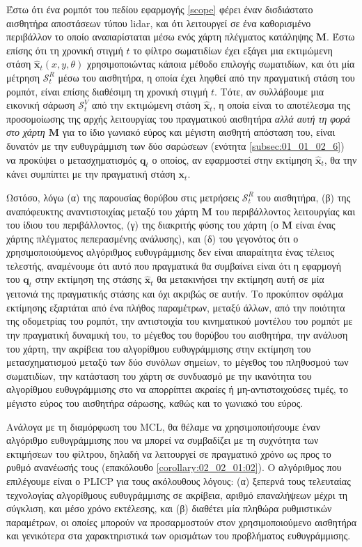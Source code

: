 Έστω ότι ένα ρομπότ του πεδίου εφαρμογής \ref{scope} φέρει έναν δισδιάστατο
αισθητήρα αποστάσεων τύπου lidar, και ότι λειτουργεί σε ένα καθορισμένο
περιβάλλον το οποίο αναπαρίσταται μέσω ενός χάρτη πλέγματος κατάληψης $\bm{M}$.
Έστω επίσης ότι τη χρονική στιγμή $t$ το φίλτρο σωματιδίων έχει εξάγει μια
εκτιμώμενη στάση $\hat{\bm{x}}_t(x,y,\theta)$ χρησιμοποιώντας κάποια μέθοδο
επιλογής σωματιδίων, και ότι μία μέτρηση $\mathcal{S}^R_t$ μέσω του αισθητήρα,
η οποία έχει ληφθεί από την πραγματική στάση του ρομπότ, είναι επίσης διαθέσιμη
τη χρονική στιγμή $t$. Τότε, αν συλλάβουμε μια εικονική σάρωση
$\mathcal{S}^V_t$ από την εκτιμώμενη στάση $\hat{\bm{x}}_t$, η οποία είναι το
αποτέλεσμα της προσομοίωσης της αρχής λειτουργίας του πραγματικού αισθητήρα
\textit{αλλά αυτή τη φορά στο χάρτη $\bm{M}$} για το ίδιο γωνιακό εύρος και
μέγιστη αισθητή απόσταση του, είναι δυνατόν με την ευθυγράμμιση των δύο
σαρώσεων (ενότητα \ref{subsec:01_01_02_6}) να προκύψει ο μετασχηματισμός
$\bm{q}_t$ ο οποίος, αν εφαρμοστεί στην εκτίμηση $\hat{\bm{x}}_t$, θα την κάνει
συμπίπτει με την πραγματική στάση $\bm{x}_t$.

Ωστόσο, λόγω (α) της παρουσίας θορύβου στις μετρήσεις $\mathcal{S}^R_t$ του
αισθητήρα, (β) της αναπόφευκτης αναντιστοιχίας μεταξύ του χάρτη $\bm{M}$ του
περιβάλλοντος λειτουργίας και του ίδιου του περιβάλλοντος, (γ) της διακριτής
φύσης του χάρτη (ο $\bm{M}$ είναι ένας χάρτης πλέγματος πεπερασμένης ανάλυσης),
και (δ) του γεγονότος ότι ο χρησιμοποιούμενος αλγόριθμος ευθυγράμμισης δεν
είναι απαραίτητα ένας τέλειος τελεστής, αναμένουμε ότι αυτό που πραγματικά θα
συμβαίνει είναι ότι η εφαρμογή του $\bm{q}_t$ στην εκτίμηση της στάσης
$\hat{\bm{x}}_t$ θα μετακινήσει την εκτίμηση αυτή σε μία γειτονιά της
πραγματικής στάσης και όχι ακριβώς σε αυτήν. Το προκύπτον σφάλμα εκτίμησης
εξαρτάται από ένα πλήθος παραμέτρων, μεταξύ άλλων, από την ποιότητα της
οδομετρίας του ρομπότ, την αντιστοιχία του κινηματικού μοντέλου του ρομπότ με
την πραγματική δυναμική του, το μέγεθος του θορύβου του αισθητήρα, την ανάλυση
του χάρτη, την ακρίβεια του αλγορίθμου ευθυγράμμισης στην εκτίμηση του
μετασχηματισμού μεταξύ των δύο συνόλων σημείων, το μέγεθος του πληθυσμού των
σωματιδίων, την κατάσταση του χάρτη σε συνδυασμό με την ικανότητα του
αλγορίθμου ευθυγράμμισης στο να απορρίπτει ακραίες ή μη-αντιστοιχούσες τιμές,
το μέγιστο εύρος του αισθητήρα σάρωσης, καθώς και το γωνιακό του εύρος.

Ανάλογα με τη διαμόρφωση του MCL, θα θέλαμε να χρησιμοποιήσουμε έναν αλγόριθμο
ευθυγράμμισης που να μπορεί να συμβαδίζει με τη συχνότητα των εκτιμήσεων του
φίλτρου, δηλαδή να λειτουργεί σε πραγματικό χρόνο ως προς το ρυθμό ανανέωσής
τους (επακόλουθο \ref{corollary:02_02_01:02}). Ο αλγόριθμος που επιλέγουμε
είναι ο PLICP \cite{Censi2008a} για τους ακόλουθους λόγους: (α) ξεπερνά τους
τελευταίας τεχνολογίας αλγορίθμους ευθυγράμμισης σε ακρίβεια, αριθμό
επαναλήψεων μέχρι τη σύγκλιση, και μέσο χρόνο εκτέλεσης, και (β) διαθέτει μία
πληθώρα ρυθμιστικών παραμέτρων, οι οποίες μπορούν να προσαρμοστούν στον
χρησιμοποιούμενο αισθητήρα και γενικότερα στα χαρακτηριστικά των ορισμάτων του
προβλήματος ευθυγράμμισης.

